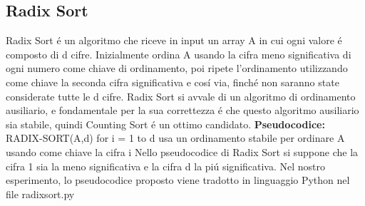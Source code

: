 \documentclass[a4paper]{article}
\begin{document}
\subsection{Radix Sort}
Radix Sort \'e un algoritmo che riceve in input un array A in cui ogni valore \'e composto di d cifre. Inizialmente ordina A usando la cifra meno significativa di ogni numero come chiave di ordinamento, poi ripete l'ordinamento utilizzando come chiave la seconda cifra significativa e cos\'i via, finch\'e non saranno state considerate tutte le d cifre. 
\newline
Radix Sort si avvale di un algoritmo di ordinamento ausiliario, e fondamentale per la sua correttezza \'e che questo algoritmo ausiliario sia stabile, quindi Counting Sort \'e un ottimo candidato.
\newline
\newline
\textbf{Pseudocodice:}
\newline
\newline
RADIX-SORT(A,d)
 for i = 1 to d
 \hspace{18pt} usa un ordinamento stabile per ordinare A usando come chiave la cifra i
\newline
\newline
Nello pseudocodice di Radix Sort si suppone che la cifra 1 sia la meno significativa e la cifra d la pi\'u significativa.
\newline
Nel nostro esperimento, lo pseudocodice proposto viene tradotto in linguaggio Python nel file radixsort.py
\end{document}
